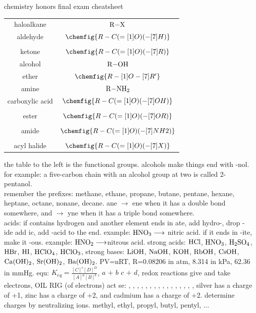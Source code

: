 \documentclass[12pt, letterpaper]{article}
\begin{document}
\begin{center}
    chemistry honors final exam cheatsheet
\end{center}
\begin{minipage}[t]{0.45\textwidth}
    \begin{tabular}[t]{c|c}
        haloalkane & $\ce{R-X}$ \\
        aldehyde & $\chemfig{R-C(=[1]O)(-[7]H)}$ \\ \\
        ketone & $\chemfig{R-C(=[1]O)(-[7]R)}$ \\
        alcohol & $\ce{R-OH}$ \\
        ether & $\chemfig{R-[1]O-[7]R'}$ \\
        amine & $\ce{R-NH2}$ \\
        carboxylic acid & $\chemfig{R-C(=[1]O)(-[7]OH)}$ \\ \\
        ester & $\chemfig{R-C(=[1]O)(-[7]OR)}$ \\ \\
        amide & $\chemfig{R-C(=[1]O)(-[7]NH2)}$ \\ \\
        acyl halide & $\chemfig{R-C(=[1]O)(-[7]X)}$
    \end{tabular}
\end{minipage}
\begin{minipage}[t]{0.45\textwidth}
    the table to the left is the functional groups. alcohols make things end with -nol. for example: a five-carbon chain with an alcohol group at two is called 2-pentanol. \\
    remember the prefixes: methane, ethane, propane, butane, pentane, hexane, heptane, octane, nonane, decane. ane $\longrightarrow$ ene when it has a double bond somewhere, and $\longrightarrow$ yne when it has a  triple bond somewhere. \\
    acids: if contains hydrogen and another element ends in ate, add hydro-, drop -ide add ic, add -acid to the end. example: $\ce{HNO3}\longrightarrow$ nitric acid. if it ends in -ite, make it -ous. example: $\ce{HNO2}\longrightarrow$nitrous acid.
    strong acids: $\ce{HCl}$, $\ce{HNO3}$, $\ce{H2SO4}$, $\ce{HBr}$, $\ce{HI}$, $\ce{HClO4}$, $\ce{HClO3}$, strong bases: $\ce{LiOH}$, $\ce{NaOH}$, $\ce{KOH}$, $\ce{RbOH}$, $\ce{CsOH}$, $\ce{Ca(OH)2}$, $\ce{Sr(OH)2}$, $\ce{Ba(OH)2}$. PV=nRT, R=0.08206 in atm, 8.314 in kPa, 62.36 in mmHg. equ: $K_{eq}=\frac{[C]^c[D]^D}{[A]^a[B]^b}$, $a$ $+$ $b$ $c$ $+$ $d$, redox reactions give and take electrons, OIL RIG (of electrons) act se: , , , , , , , , , , , , , , , , silver has a charge of +1, zinc has a charge of +2, and cadmium has a charge of +2. determine charges by neutralizing ions. methyl, ethyl, propyl, butyl, pentyl, ...
\end{minipage}
\end{document}

